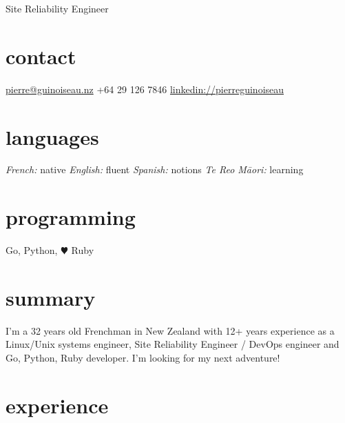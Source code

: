 \documentclass[]{friggeri-cv}
\begin{document}

       {Site Reliability Engineer}



\begin{aside}
  \section{contact}
    \href{mailto:pierre@guinoiseau.nz}{pierre@guinoiseau.nz}
    +64 29 126 7846
    \href{https://linkedin.com/in/pierreguinoiseau}{linkedin://pierreguinoiseau}
  \section{languages}
    \textit{French:} native
    \textit{English:} fluent
    \textit{Spanish:} notions
    \textit{Te Reo Māori:} learning
  \section{programming}
    Go, Python, {\color{red} $\varheartsuit$} Ruby
\end{aside}



\section{summary}

I'm a 32 years old Frenchman in New Zealand with 12+ years experience as a
Linux/Unix systems engineer, Site Reliability Engineer / DevOps engineer and
Go, Python, Ruby developer. I'm looking for my next adventure!



\section{experience}
\end{document}
